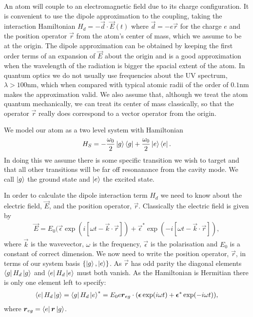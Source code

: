 An atom will couple to an electromagnetic field due to its charge configuration. It is convenient to use the dipole approximation to the coupling, taking the interaction Hamiltonian $H_d = -\vec{d}\cdot\vec{E}(t)$ where $\vec{d} = -e \vec{r}$ for the charge $e$ and the position operator $\vec{r}$ from the atom's center of mass, which we assume to be at the origin. The dipole approximation can be obtained by keeping the first order terms of an expansion of $\vec{E}$ about the origin and is a good approximation when the wavelength of the radiation is bigger the spacial extent of the atom. In quantum optics we do not usually use frequencies about the UV spectrum, $\lambda > 100\text{nm}$, which when compared with typical atomic radii of the order of $0.1\text{nm}$ makes the approximation valid. We also assume that, although we treat the atom quantum mechanically, we can treat its center of mass classically, so that the operator $\vec{r}$ really does correspond to a vector operator from the origin. 

We model our atom as a two level system with Hamiltonian
\begin{align}
  H_S = -\frac{\omega_0}{2}\left\vert g\right\rangle\left\langle g\right\vert +\frac{\omega_0}{2}\left\vert e\right\rangle\left\langle e\right\vert.
\end{align}
In doing this we assume there is some specific transition we wish to target and that all other transitions will be far off resonanance from the cavity mode. We call $\left\vert g\right\rangle$ the ground state and $\left\vert e\right\rangle$ the excited state. 

In order to calculate the dipole interaction term $H_d$ we need to know about the electric field, $\vec{E}$, and the position operator, $\vec{r}$. Classically the electric field is given by
\begin{align}
  \vec{E} = E_0 (\vec{\epsilon}\exp(i[\omega t - \vec{k}\cdot\vec{r}]) + \vec{\epsilon}^*\exp(-i[\omega t - \vec{k}\cdot\vec{r}]),
\end{align}
where $\vec{k}$ is the wavevector, $\omega$ is the frequency, $\vec{\epsilon}$ is the polarisation and $E_0$ is a constant of correct dimension.  We now need to write the position operator, $\vec{r}$, in terms of our system basis $\{\left\vert g\right\rangle, \left\vert e\right\rangle\}$. As $\vec{r}$ has odd parity the diagonal elements $\left\langle g\right\vert H_d\left\vert g\right\rangle$ and $\left\langle e\right\vert H_d\left\vert e\right\rangle$ must both vanish. As the Hamiltonian is Hermitian there is only one element left to specify:
\begin{align}
  \left\langle e\right\vert H_d\left\vert g\right\rangle = \left\langle g\right\vert H_d\left\vert e\right\rangle^* = E_0e{\boldsymbol{r}}_{eg}\cdot({\boldsymbol{\epsilon}}\exp(i\omega t) + {\boldsymbol{\epsilon}}^*\exp(-i\omega t)),
\end{align}
where ${\boldsymbol{r}}_{eg} = \left\langle e\right\vert{\boldsymbol{r}}\left\vert g\right\rangle$.

